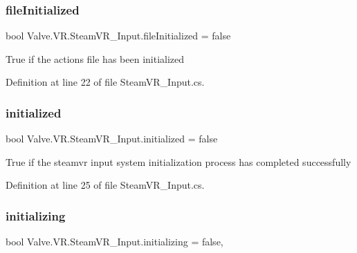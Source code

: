 \subsubsection{\texorpdfstring{fileInitialized}{fileInitialized}}
{\footnotesize\ttfamily bool Valve.\+V\+R.\+Steam\+V\+R\+\_\+\+Input.\+file\+Initialized = false\hspace{0.3cm}{\ttfamily [static]}}



True if the actions file has been initialized 



Definition at line 22 of file Steam\+V\+R\+\_\+\+Input.\+cs.

\mbox{\label{class_valve_1_1_v_r_1_1_steam_v_r___input_a2a5ac88955294a891324af8121e02f3e}} 
\subsubsection{\texorpdfstring{initialized}{initialized}}
{\footnotesize\ttfamily bool Valve.\+V\+R.\+Steam\+V\+R\+\_\+\+Input.\+initialized = false\hspace{0.3cm}{\ttfamily [static]}}



True if the steamvr input system initialization process has completed successfully 



Definition at line 25 of file Steam\+V\+R\+\_\+\+Input.\+cs.

\mbox{\label{class_valve_1_1_v_r_1_1_steam_v_r___input_a6fe24069d4c06479c3e9ee90dd26334e}} 
\subsubsection{\texorpdfstring{initializing}{initializing}}
{\footnotesize\ttfamily bool Valve.\+V\+R.\+Steam\+V\+R\+\_\+\+Input.\+initializing = false\hspace{0.3cm}{\ttfamily [static]}, {\ttfamily [protected]}}



